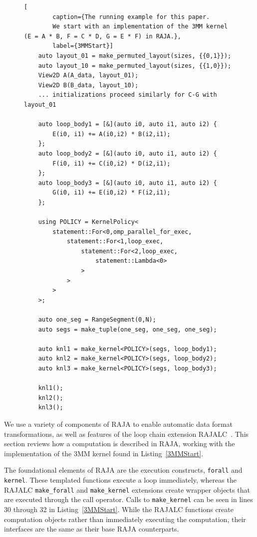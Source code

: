 \documentclass[sigconf]{acmart}
\begin{document}
\begin{figure}
	\begin{lstlisting}[
		caption={The running example for this paper. 
		We start with an implementation of the 3MM kernel (E = A * B, F = C * D, G = E * F) in RAJA.},
		label={3MMStart}]
	auto layout_01 = make_permuted_layout(sizes, {{0,1}});
	auto layout_10 = make_permuted_layout(sizes, {{1,0}});
	View2D A(A_data, layout_01);
	View2D B(B_data, layout_10);
	... initializations proceed similarly for C-G with layout_01

	auto loop_body1 = [&](auto i0, auto i1, auto i2) {
		E(i0, i1) += A(i0,i2) * B(i2,i1);
	};
	auto loop_body2 = [&](auto i0, auto i1, auto i2) {
		F(i0, i1) += C(i0,i2) * D(i2,i1);
	};
	auto loop_body3 = [&](auto i0, auto i1, auto i2) {
		G(i0, i1) += E(i0,i2) * F(i2,i1);
	};
	
	using POLICY = KernelPolicy<
		statement::For<0,omp_parallel_for_exec,
			statement::For<1,loop_exec,
				statement::For<2,loop_exec,
					statement::Lambda<0>
				>
			>
		>
	>;

	auto one_seg = RangeSegment(0,N);
	auto segs = make_tuple(one_seg, one_seg, one_seg);

	auto knl1 = make_kernel<POLICY>(segs, loop_body1);
	auto knl2 = make_kernel<POLICY>(segs, loop_body2);
	auto knl3 = make_kernel<POLICY>(segs, loop_body3);

	knl1();
	knl2();
	knl3();
	\end{lstlisting}
\end{figure}


We use a variety of components of RAJA to enable automatic data format transformations, as well as features of the loop chain extension RAJALC~\cite{neth2021inter}. 
This section reviews how a computation is described in RAJA, working with the implementation of the 3MM kernel found in Listing~\ref{3MMStart}.

The foundational elements of RAJA are the execution constructs, \verb.forall. and \verb.kernel.. 
These templated functions execute a loop immediately, whereas the RAJALC \verb.make_forall. and \verb.make_kernel. extensions create wrapper objects that are executed through the call operator. 
Calls to \verb.make_kernel. can be seen in lines 30 through 32 in Listing~\ref{3MMStart}. 
While the RAJALC functions create computation objects rather than immediately executing the computation, their interfaces are the same as their base RAJA counterparts.
\end{document}
